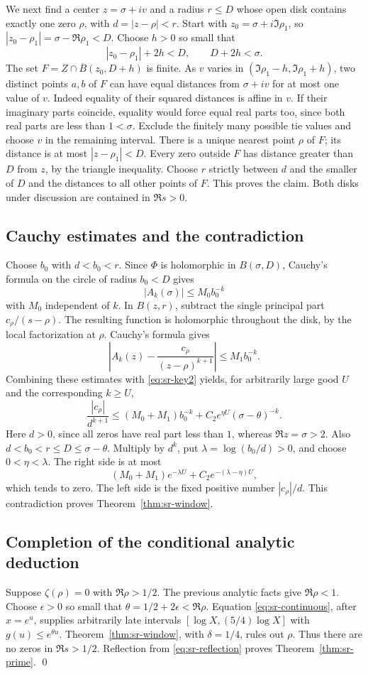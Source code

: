 We next find a center \(z=\sigma+iv\) and a radius \(r\leq D\) whose open
disk contains exactly one zero \(\rho\), with \(d=|z-\rho|<r\).
Start with \(z_0=\sigma+i\Im\rho_1\), so
\(|z_0-\rho_1|=\sigma-\Re\rho_1<D\).
Choose \(h>0\) so small that
\[
 |z_0-\rho_1|+2h<D,\qquad D+2h<\sigma .
\]
The set \(F=Z\cap\overline B(z_0,D+h)\) is finite. As \(v\) varies in
\((\Im\rho_1-h,\Im\rho_1+h)\), two distinct points \(a,b\) of \(F\)
can have equal distances from \(\sigma+iv\) for at most one value of \(v\).
Indeed equality of their squared distances is affine in \(v\).
If their imaginary parts coincide, equality would force equal real
parts too, since both real parts are less than \(1<\sigma\).
Exclude the finitely many possible tie values and choose \(v\) in the
remaining interval. There is a unique nearest point \(\rho\) of \(F\);
its distance is at most \(|z-\rho_1|<D\).
Every zero outside \(F\) has distance greater than \(D\) from \(z\),
by the triangle inequality.
Choose \(r\) strictly between \(d\) and the smaller of \(D\) and the
distances to all other points of \(F\). This proves the claim.
Both disks under discussion are contained in \(\Re s>0\).

\subsection{Cauchy estimates and the contradiction}
Choose \(b_0\) with \(d<b_0<r\).
Since \(\Phi\) is holomorphic in \(B(\sigma,D)\), Cauchy's formula
on the circle of radius \(b_0<D\) gives
\[
 |A_k(\sigma)|\leq M_0 b_0^{-k}
\]
with \(M_0\) independent of \(k\).
In \(B(z,r)\), subtract the single principal part
\(c_\rho/(s-\rho)\). The resulting function is holomorphic throughout
the disk, by the local factorization at \(\rho\). Cauchy's formula gives
\[
 \left|A_k(z)-\frac{c_\rho}{(z-\rho)^{k+1}}\right|
 \leq M_1 b_0^{-k}.
\]
Combining these estimates with \eqref{eq:sr-key2} yields, for arbitrarily
large good \(U\) and the corresponding \(k\geq U\),
\[
 \frac{|c_\rho|}{d^{k+1}}
 \leq(M_0+M_1)b_0^{-k}
       +C_2e^{\eta U}(\sigma-\theta)^{-k}.
\]
Here \(d>0\), since all zeros have real part less than \(1\), whereas
\(\Re z=\sigma>2\). Also \(d<b_0<r\leq D\leq\sigma-\theta\).
Multiply by \(d^k\), put \(\lambda=\log(b_0/d)>0\), and choose
\(0<\eta<\lambda\).
The right side is at most
\[
 (M_0+M_1)e^{-\lambda U}
   +C_2e^{-(\lambda-\eta)U},
\]
which tends to zero. The left side is the fixed positive number
\(|c_\rho|/d\). This contradiction proves
Theorem~\ref{thm:sr-window}.

\subsection{Completion of the conditional analytic deduction}
Suppose \(\zeta(\rho)=0\) with \(\Re\rho>1/2\).
The previous analytic facts give \(\Re\rho<1\).
Choose \(\epsilon>0\) so small that
\(\theta=1/2+2\epsilon<\Re\rho\).
Equation \eqref{eq:sr-continuous}, after \(x=e^u\), supplies arbitrarily
late intervals \([\log X,(5/4)\log X]\) with
\(g(u)\leq e^{\theta u}\).
Theorem~\ref{thm:sr-window}, with \(\delta=1/4\), rules out \(\rho\).
Thus there are no zeros in \(\Re s>1/2\).
Reflection from \eqref{eq:sr-reflection} proves
Theorem~\ref{thm:sr-prime}.
\qed
